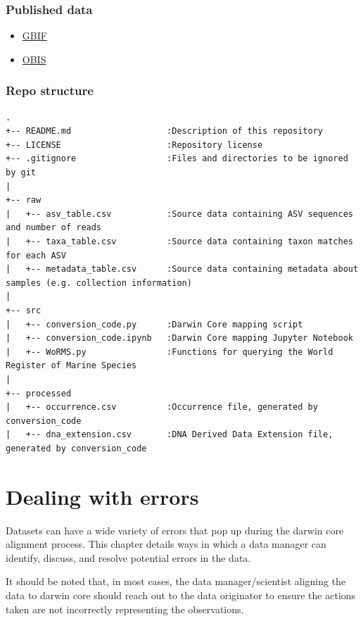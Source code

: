 \documentclass[
]{book}
\providecommand{\tightlist}{%
  \setlength{\itemsep}{0pt}\setlength{\parskip}{0pt}}
\begin{document}
\hypertarget{published-data}{%
\subsection{Published data}\label{published-data}}

\begin{itemize}
\tightlist
\item
  \href{https://www.gbif.org/dataset/e0b59ee7-19ae-4eb0-9217-33317fb50d47}{GBIF}
\item
  \href{https://obis.org/dataset/62b97724-da17-4ca7-9b26-b2a22aeaab51}{OBIS}
\end{itemize}

\hypertarget{repo-structure}{%
\subsection{Repo structure}\label{repo-structure}}

\begin{verbatim}
.
+-- README.md                   :Description of this repository
+-- LICENSE                     :Repository license
+-- .gitignore                  :Files and directories to be ignored by git
|
+-- raw
|   +-- asv_table.csv           :Source data containing ASV sequences and number of reads
|   +-- taxa_table.csv          :Source data containing taxon matches for each ASV
|   +-- metadata_table.csv      :Source data containing metadata about samples (e.g. collection information)
|
+-- src
|   +-- conversion_code.py      :Darwin Core mapping script
|   +-- conversion_code.ipynb   :Darwin Core mapping Jupyter Notebook
|   +-- WoRMS.py                :Functions for querying the World Register of Marine Species
|
+-- processed
|   +-- occurrence.csv          :Occurrence file, generated by conversion_code
|   +-- dna_extension.csv       :DNA Derived Data Extension file, generated by conversion_code
\end{verbatim}

\hypertarget{dealing-with-errors}{%
\chapter{Dealing with errors}\label{dealing-with-errors}}

Datasets can have a wide variety of errors that pop up during the darwin core alignment process. This chapter details
ways in which a data manager can identify, discuss, and resolve potential errors in the data.

It should be noted that, in most cases, the data manager/scientist aligning the data to darwin core should reach out
to the data originator to ensure the actions taken are not incorrectly representing the observations.
\end{document}
